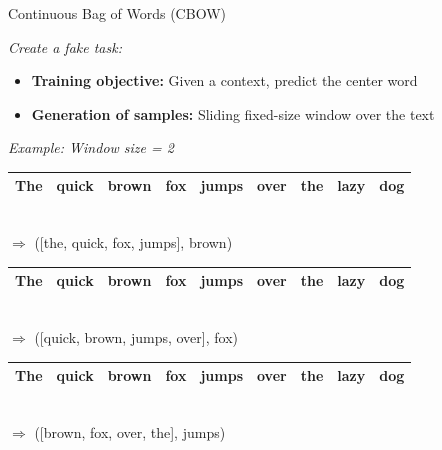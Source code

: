 \begin{vbframe}{Continuous Bag of Words (CBOW)}

\vfill

\textit{Create a fake task:}

\begin{itemize}
	\item \textbf{Training objective:} Given a context, predict the center word
	\item \textbf{Generation of samples:} Sliding fixed-size window over the text
\end{itemize}

\textit{Example: Window size = 2}

\medskip

\begin{tabular}{|c|c|c|c|c|cccc|}
\hline
\cellcolor{blue!15}The & \cellcolor{blue!15}quick & \cellcolor{blue!65}brown & \cellcolor{blue!15}fox & \cellcolor{blue!15}jumps & over & the & lazy & dog \\
\hline
\end{tabular}\\
$\Rightarrow$ \qquad ([the, quick, fox, jumps], brown)
\begin{tabular}{|c|c|c|c|c|c|ccc|}
\hline
The & \cellcolor{blue!15}quick & \cellcolor{blue!15}brown & \cellcolor{blue!65}fox & \cellcolor{blue!15}jumps & \cellcolor{blue!15}over & the & lazy & dog \\
\hline
\end{tabular}\\
$\Rightarrow$ \qquad ([quick, brown, jumps, over], fox)
\begin{tabular}{|cc|c|c|c|c|c|cc|}
\hline
The & quick & \cellcolor{blue!15}brown & \cellcolor{blue!15}fox & \cellcolor{blue!65}jumps & \cellcolor{blue!15}over & \cellcolor{blue!15}the & lazy & dog \\
\hline
\end{tabular}\\
$\Rightarrow$ \qquad ([brown, fox, over, the], jumps)
\vfill

\end{vbframe}


